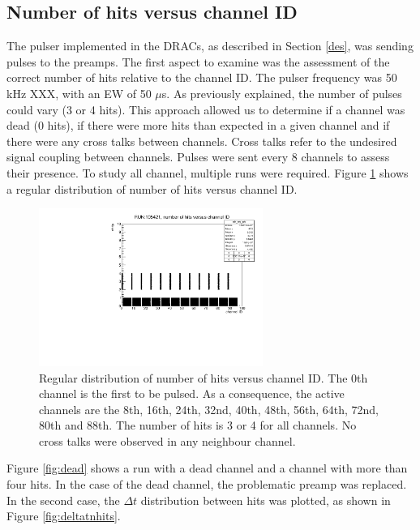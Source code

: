 \subsection{Number of hits versus channel ID}\label{nhitvschid}
The pulser implemented in the DRACs, as described in Section \ref{des}, was sending pulses to the preamps. 
The first aspect to examine was the assessment of the correct number of hits relative to the channel ID.
The pulser frequency was 50 kHz XXX, with an EW of 50 $\mu$s. As previously explained, 
the number of pulses could vary (3 or 4 hits). This approach allowed us to determine if a channel was dead (0 hits), 
if there were more hits than expected in a given channel and if there were any cross talks between channels. 
Cross talks refer to the undesired signal coupling between channels. 
Pulses were sent every 8 channels to assess their presence. To study all channel, multiple runs were required.
Figure \ref{fig:normalhits} shows a regular distribution of number of hits versus channel ID.
\begin{figure}[!h]
      \centering
      \includegraphics[width=0.65\textwidth]{figures/pdf/run105421_nh_vs_ch.pdf}
      \caption{Regular distribution of number of hits versus channel ID. The 0th channel is the first to be pulsed.
      As a consequence, the active channels are the 8th, 16th, 24th, 32nd, 40th, 48th, 56th, 64th, 72nd, 80th and 88th. The number of hits is 3 or 4 for all channels. 
      No cross talks were observed in any neighbour channel.}
     \label{fig:normalhits}
\end{figure}
Figure \ref{fig:dead} shows a run with a dead channel and a channel with more than four hits. 
In the case of the dead channel, the problematic preamp was replaced. In the second case, the 
$\Delta t$ distribution between hits was plotted, as shown in Figure \ref{fig:deltatnhits}.

